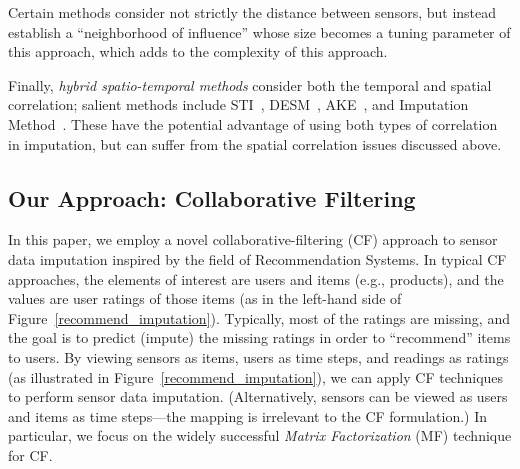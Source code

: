 Certain methods consider not strictly the distance between sensors,
but instead establish a ``neighborhood of influence'' whose size
becomes a tuning parameter of this approach, which adds to the
complexity of this approach.

Finally, {\em hybrid spatio-temporal methods} consider both the
temporal and spatial correlation; salient methods include
STI~\cite{Jian-Zhong:STI}, DESM~\cite{li2008data},
AKE~\cite{pan2010k}, and Imputation Method~\cite{Lim:robust}.  These
have the potential advantage of using both types of correlation in
imputation, but can suffer from the spatial correlation issues
discussed above.




\subsection{Our Approach: Collaborative Filtering}

In this paper, we employ a novel collaborative-filtering (CF) approach
to sensor data imputation inspired by the field of Recommendation
Systems.  In typical CF approaches, the elements of interest are users
and items (e.g., products), and the values are user ratings of those
items (as in the left-hand side of
Figure~\ref{recommend_imputation}).  Typically, most of the ratings
are missing, and the goal is to predict (impute) the missing ratings
in order to ``recommend'' items to users.  By viewing sensors as
items, users as time steps, and readings as ratings (as illustrated in
Figure~\ref{recommend_imputation}), we can apply CF
techniques to perform sensor data imputation. (Alternatively, sensors
can be viewed as users and items as time steps---the mapping is
irrelevant to the CF formulation.)  In particular, we focus on the
widely successful {\em Matrix Factorization} (MF) technique for CF.


